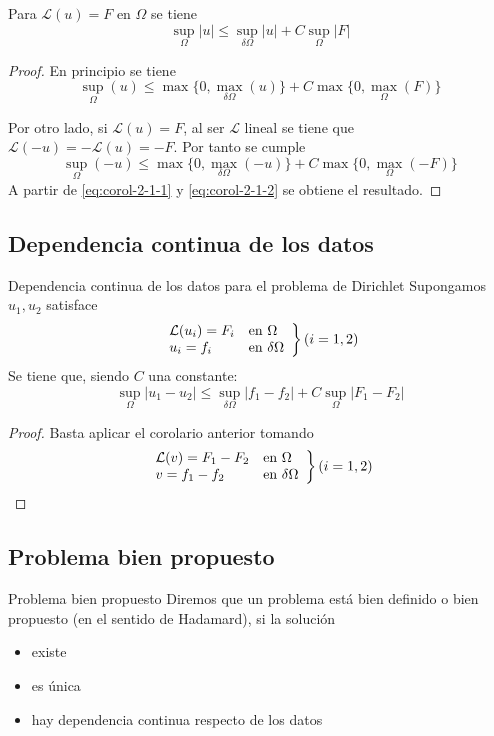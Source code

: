 \corol
Para $\mathcal{L}(u) = F$ en $\Omega$ se tiene
$$
\sup_{\Omega}|u| \le \sup_{\delta\Omega}|u|+C\sup_\Omega |F|
$$
\begin{proof}
En principio se tiene
\begin{equation}\label{eq:corol-2-1-1}
\sup_{\Omega}(u) \le \max\{0, \max_{\delta\Omega}(u)\}+C\max\{0,\max_\Omega (F)\}
\end{equation}

Por otro lado, si $\mathcal{L}(u) = F$, al ser $\mathcal{L}$ lineal se tiene que $\mathcal{L}(-u) = -\mathcal{L}(u) = -F$. Por tanto se cumple 
\begin{equation}\label{eq:corol-2-1-2}
\sup_{\Omega}(-u) \le \max\{0, \max_{\delta\Omega}(-u)\}+C\max\{0, \max_\Omega (-F)\}
\end{equation}
A partir de \eqref{eq:corol-2-1-1} y \eqref{eq:corol-2-1-2} se obtiene el resultado.
\end{proof}

\newpage
\subsection{Dependencia continua de los datos}
\begin{prop}{Dependencia continua de los datos para el problema de Dirichlet}
Supongamos $u_1, u_2$ satisface 
\begin{equation*}
\left.
\begin{array}{l l}
\mathcal{L}(u_i)=F_i & \text{en } \Omega\\
u_i=f_i & \text{en } \delta\Omega\\
\end{array}
\right\} (i=1,2)
\end{equation*}
Se tiene que, siendo $C$ una constante:
$$\sup_\Omega|u_1-u_2| \le \sup_{\delta\Omega}|f_1-f_2|+C\sup_\Omega|F_1-F_2|$$
\end{prop}
\begin{proof}
Basta aplicar el corolario anterior tomando
\begin{equation*}
\left.
\begin{array}{l l}
\mathcal{L}(v)=F_1-F_2 & \text{en } \Omega\\
v=f_1-f_2 & \text{en } \delta\Omega\\
\end{array}
\right\} (i=1,2)
\end{equation*}
\end{proof}

\subsection{Problema bien propuesto}
\begin{definition}{Problema bien propuesto}
Diremos que un problema está bien definido o bien propuesto (en el sentido de Hadamard), si la solución
\begin{itemize}
\item existe
\item es única
\item hay dependencia continua respecto de los datos
\end{itemize}
\end{definition}